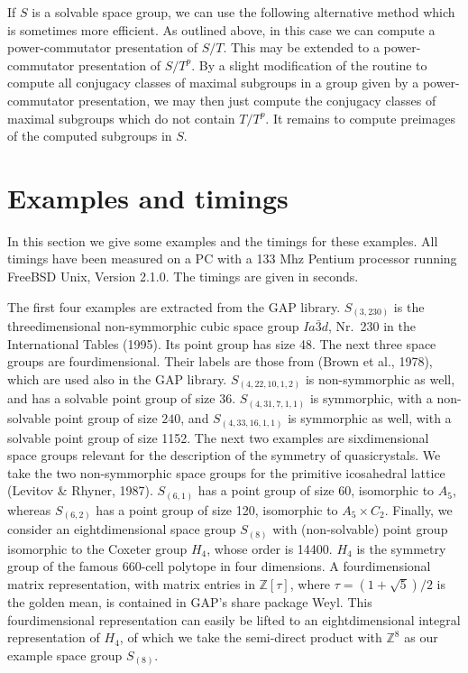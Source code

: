 \documentclass[12pt]{amsart}
\newcommand{\Z}{{\mathbb Z}}
\newcommand{\GAP}{{\sf GAP}}
\begin{document}
If $S$ is a solvable space group, we can use the following alternative
method which is sometimes more efficient. As outlined above, in
this case we can compute a power-commutator presentation of $S / T$.
This may be extended to a power-commutator presentation of $S / T^p$.
By a slight modification of the routine to compute all conjugacy
classes of maximal subgroups in a group given by a power-commutator
presentation, we may then just compute the conjugacy classes of maximal
subgroups which do not contain $T / T^p$. It remains to compute
preimages of the computed subgroups in $S$.


\section{Examples and timings}
\label{sexam}

In this section we give some examples and the timings for these
examples. All timings have been measured on a PC with a 133 Mhz Pentium
processor running FreeBSD Unix, Version 2.1.0. The timings are given in
seconds.

The first four examples are extracted from the {\GAP} library.
$S_{(3,230)}$ is the threedimensional non-symmorphic cubic space 
group $Ia\bar{3}d$, Nr.\ 230 in the International Tables (1995). 
Its point group has size 48. The next three space groups are 
fourdimensional. Their labels are those from (Brown et al., 1978), 
which are used also in the {\GAP} library. $S_{(4,22,10,1,2)}$ is 
non-symmorphic as well, and has a solvable point group of size $36.$ 
$S_{(4,31,7,1,1)}$ is symmorphic, with a non-solvable point group of 
size $240$, and $S_{(4,33,16,1,1)}$ is symmorphic as well, with a 
solvable point group of size 1152. The next two examples are 
sixdimensional space groups relevant for the description of the 
symmetry of quasicrystals. We take the two non-symmorphic space 
groups for the primitive icosahedral lattice (Levitov \& Rhyner,
1987). $S_{(6,1)}$ has a point group of size 60, isomorphic to $A_5$, 
whereas $S_{(6,2)}$ has a point group of size 120, isomorphic to 
$A_5\times C_2$. Finally, we consider an eightdimensional
space group $S_{(8)}$ with (non-solvable) point group isomorphic to 
the Coxeter group $H_4$, whose order is 14400. $H_4$ is the symmetry 
group of the famous 660-cell polytope in four dimensions. A 
fourdimensional matrix representation, with matrix entries in 
$\Z[\tau]$, where $\tau=(1+\sqrt{5})/2$ is the golden mean, is 
contained in {\GAP}'s share package Weyl. This fourdimensional
representation can easily be lifted to an eightdimensional
integral representation of $H_4$, of which we take the semi-direct
product with $\Z^8$ as our example space group $S_{(8)}$.
\end{document}
